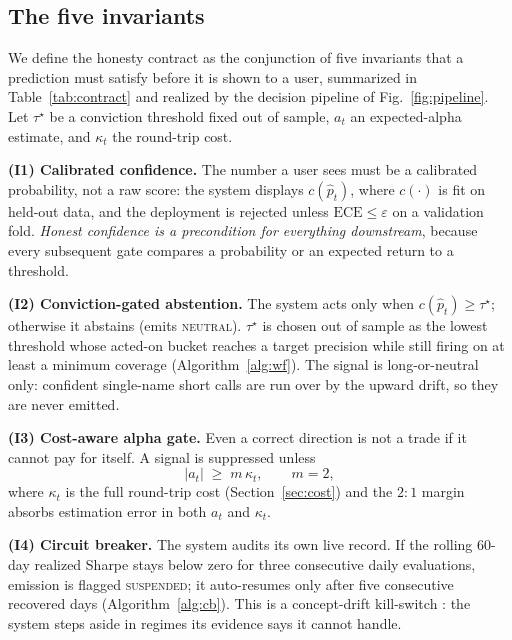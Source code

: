 \documentclass[conference]{IEEEtran}
\begin{document}
\subsection{The five invariants}
We define the honesty contract as the conjunction of five invariants that a
prediction must satisfy before it is shown to a user, summarized in
Table~\ref{tab:contract} and realized by the decision pipeline of
Fig.~\ref{fig:pipeline}. Let $\tau^\star$ be a conviction threshold fixed out of
sample, $a_t$ an expected-alpha estimate, and $\kappa_t$ the round-trip cost.

\smallskip\noindent\textbf{(I1) Calibrated confidence.} The number a user sees must
be a calibrated probability, not a raw score: the system displays $c(\hat p_t)$,
where $c(\cdot)$ is fit on held-out data, and the deployment is rejected unless
$\mathrm{ECE}\le\varepsilon$ on a validation fold. \emph{Honest confidence is a
precondition for everything downstream}, because every subsequent gate compares a
probability or an expected return to a threshold.

\smallskip\noindent\textbf{(I2) Conviction-gated abstention.} The system acts only
when $c(\hat p_t)\ge\tau^\star$; otherwise it abstains (emits \textsc{neutral}).
$\tau^\star$ is chosen out of sample as the lowest threshold whose acted-on bucket
reaches a target precision while still firing on at least a minimum coverage
(Algorithm~\ref{alg:wf}). The signal is long-or-neutral only: confident
single-name short calls are run over by the upward drift, so they are never
emitted.

\smallskip\noindent\textbf{(I3) Cost-aware alpha gate.} Even a correct direction is
not a trade if it cannot pay for itself. A signal is suppressed unless
\begin{equation}
|a_t|\;\ge\; m\,\kappa_t,\qquad m=2,
\label{eq:alphagate}
\end{equation}
where $\kappa_t$ is the full round-trip cost (Section~\ref{sec:cost}) and the
$2{:}1$ margin absorbs estimation error in both $a_t$ and $\kappa_t$.

\smallskip\noindent\textbf{(I4) Circuit breaker.} The system audits its own live
record. If the rolling 60-day realized Sharpe stays below zero for three
consecutive daily evaluations, emission is flagged \textsc{suspended}; it
auto-resumes only after five consecutive recovered days (Algorithm~\ref{alg:cb}).
This is a concept-drift kill-switch \cite{gama2014,sculley2015}: the system steps
aside in regimes its evidence says it cannot handle.
\end{document}
